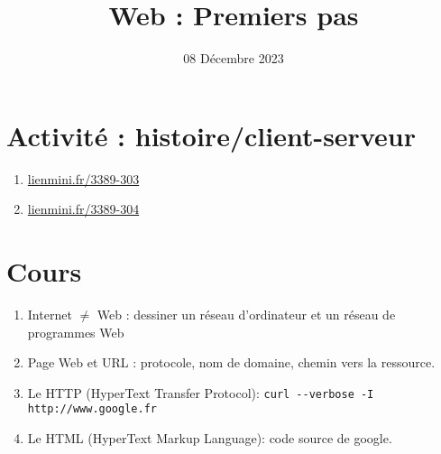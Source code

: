 \documentclass{article}
\title{Web : Premiers pas}
\date{08 Décembre 2023}
\begin{document}
\maketitle
\section{Activité : histoire/client-serveur}
\begin{enumerate}
\item \url{lienmini.fr/3389-303}
\item \url{lienmini.fr/3389-304}
\end{enumerate}
\section{Cours}
\begin{enumerate}
\item Internet $\neq$ Web : dessiner un réseau d'ordinateur et un réseau de programmes Web
\item Page Web et URL : protocole, nom de domaine, chemin vers la ressource.
\item Le HTTP (HyperText Transfer Protocol): \verb|curl --verbose -I http://www.google.fr|
\item Le HTML (HyperText Markup Language): code source de google.
\end{enumerate}
\end{document}
